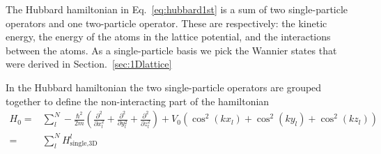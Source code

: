 \documentclass[11pt,letter]{article}
\newcommand{\vo}{\ensuremath{V_{0}}}
\begin{document}
The Hubbard hamiltonian in Eq.~\ref{eq:hubbard1st} is a sum of two
single-particle operators and one two-particle operator.  These are
respectively: the kinetic energy, the energy of the atoms in the lattice
potential, and the interactions between the atoms.  As a single-particle basis
we pick the Wannier states that were derived in Section.~\ref{sec:1Dlattice}

In the Hubbard hamiltonian the two single-particle operators are grouped
together to define the non-interacting part of the hamiltonian 
\begin{equation}
\begin{split}
  H_{0} = & \sum_{l}^{N} -\frac{\hbar^{2}}{2m} \left( \frac{\partial^{2}}{\partial x_{l}^{2}}
                            + \frac{\partial^{2}}{\partial y_{l}^{2}}
                            + \frac{\partial^{2}}{\partial z_{l}^{2}} \right)
 + \vo\left( \cos^{2}(kx_{l})  + \cos^{2}(ky_{l}) + \cos^{2}(kz_{l}) \right) \\
       = & \sum_{l}^{N} H_{\text{single,3D}}^{l}
\end{split}
\end{equation}
\end{document}
